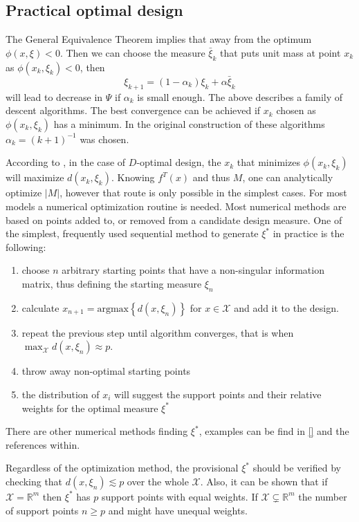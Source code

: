 \documentclass[12pt]{iopart}
\begin{document}
\subsection{Practical optimal design}
\label{sec:findoptimal}
The General Equivalence Theorem implies that away from the optimum $\phi(x, \xi) < 0$. Then we can choose the measure $\bar \xi_k$ that puts unit mass at point $x_k$ as $\phi(x_k, \xi_k) < 0$, then
\begin{equation}
\xi_{k+1} = (1-\alpha_k) \xi_k + \alpha \bar \xi_k
\end{equation}
will lead to decrease in $\Psi$ if $\alpha_k$ is small enough. The above describes a family of descent algorithms. The best convergence can be achieved if $x_k$ chosen as $\phi(x_k, \xi_k)$ has a minimum. In the original construction of these algorithms $\alpha_k = (k+1)^{-1}$ was chosen.

According to , in the case of $D$-optimal design, the $x_k$ that minimizes $\phi(x_k, \xi_k)$ will maximize $d(x_k, \xi_k)$. Knowing $f^T(x)$ and thus $M$, one can analytically optimize $|M|$, however that route is only possible in the simplest cases. For most models a numerical optimization routine is needed. Most numerical methods are based on points added to, or removed from a candidate design measure. One of the simplest, frequently used sequential method to generate $\xi^*$ in practice is the following:
\begin{enumerate}
\item choose $n$ arbitrary starting points that have a non-singular information matrix, thus defining the starting measure $\xi_n$
\item calculate $x_{n+1} = \mathrm{argmax}\left\{d(x, \xi_n)\right\}$ for $x \in \mathcal{X}$ and add it to the design.
\item repeat the previous step until algorithm converges, that is when $\max_{\mathcal{X}} d(x, \xi_{n}) \approx p$.
\item throw away non-optimal starting points
\item the distribution of $x_i$ will suggest the support points and their relative weights for the optimal measure $\xi^*$
\end{enumerate}
There are other numerical methods finding $\xi^*$, examples can be find in \ref{} and the references within.

Regardless of the optimization method, the provisional $\xi^*$ should be verified by checking that $d(x, \xi_{n}) \lesssim p$ over the whole $\mathcal{X}$. Also, it can be shown that if $\mathcal{X} = \mathbb{R}^m$ then $\xi^*$ has $p$ support points with equal weights. If $\mathcal{X} \subsetneq \mathbb{R}^m$ the number of support points $n \geq p$ and might have unequal weights.
\end{document}
